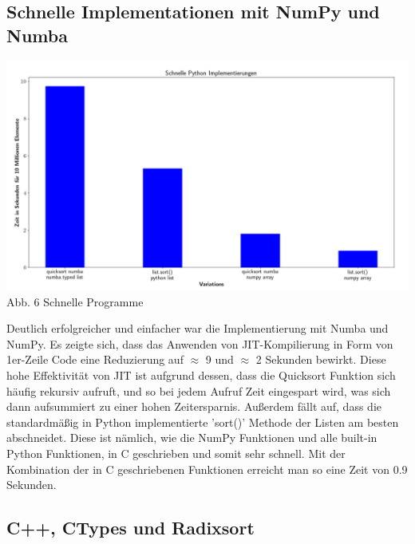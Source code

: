 \documentclass[10pt,a4paper]{article}
\begin{document}
\subsection{Schnelle Implementationen mit NumPy und Numba}

\begin{center}
    \hspace*{-1.5cm}\includegraphics[width=1.2\textwidth]{./diagramme/matplotlib/pythonschnell.png}
    Abb. 6 Schnelle Programme
\end{center}

Deutlich erfolgreicher und einfacher war die Implementierung mit Numba und NumPy.
Es zeigte sich, dass das Anwenden von JIT-Kompilierung in Form von 1er-Zeile Code
eine Reduzierung auf $\approx$ 9 und $\approx$ 2 Sekunden bewirkt. Diese hohe Effektivität von JIT
ist aufgrund dessen, dass die Quicksort Funktion sich häufig rekursiv aufruft, und so bei jedem Aufruf
Zeit eingespart wird, was sich dann aufsummiert zu einer hohen Zeitersparnis.
Außerdem fällt auf, dass die standardmäßig in Python implementierte 'sort()' Methode der Listen
am besten abschneidet. Diese ist nämlich, wie die NumPy Funktionen und alle built-in Python Funktionen, in C geschrieben und
somit sehr schnell. Mit der Kombination der in C geschriebenen Funktionen erreicht man so eine Zeit von 0.9 Sekunden.

\subsection{C++, CTypes und Radixsort}
\end{document}
